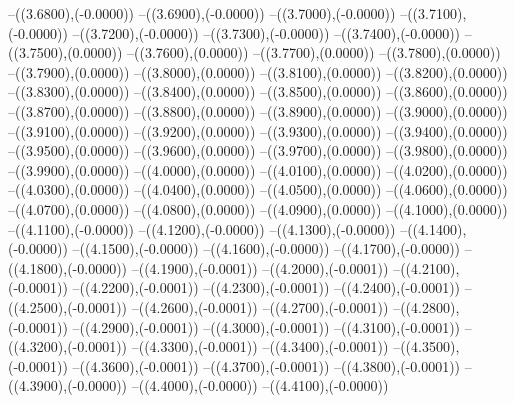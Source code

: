 {	--({\sx*(3.6800)},{\sy*(-0.0000)})
	--({\sx*(3.6900)},{\sy*(-0.0000)})
	--({\sx*(3.7000)},{\sy*(-0.0000)})
	--({\sx*(3.7100)},{\sy*(-0.0000)})
	--({\sx*(3.7200)},{\sy*(-0.0000)})
	--({\sx*(3.7300)},{\sy*(-0.0000)})
	--({\sx*(3.7400)},{\sy*(-0.0000)})
	--({\sx*(3.7500)},{\sy*(0.0000)})
	--({\sx*(3.7600)},{\sy*(0.0000)})
	--({\sx*(3.7700)},{\sy*(0.0000)})
	--({\sx*(3.7800)},{\sy*(0.0000)})
	--({\sx*(3.7900)},{\sy*(0.0000)})
	--({\sx*(3.8000)},{\sy*(0.0000)})
	--({\sx*(3.8100)},{\sy*(0.0000)})
	--({\sx*(3.8200)},{\sy*(0.0000)})
	--({\sx*(3.8300)},{\sy*(0.0000)})
	--({\sx*(3.8400)},{\sy*(0.0000)})
	--({\sx*(3.8500)},{\sy*(0.0000)})
	--({\sx*(3.8600)},{\sy*(0.0000)})
	--({\sx*(3.8700)},{\sy*(0.0000)})
	--({\sx*(3.8800)},{\sy*(0.0000)})
	--({\sx*(3.8900)},{\sy*(0.0000)})
	--({\sx*(3.9000)},{\sy*(0.0000)})
	--({\sx*(3.9100)},{\sy*(0.0000)})
	--({\sx*(3.9200)},{\sy*(0.0000)})
	--({\sx*(3.9300)},{\sy*(0.0000)})
	--({\sx*(3.9400)},{\sy*(0.0000)})
	--({\sx*(3.9500)},{\sy*(0.0000)})
	--({\sx*(3.9600)},{\sy*(0.0000)})
	--({\sx*(3.9700)},{\sy*(0.0000)})
	--({\sx*(3.9800)},{\sy*(0.0000)})
	--({\sx*(3.9900)},{\sy*(0.0000)})
	--({\sx*(4.0000)},{\sy*(0.0000)})
	--({\sx*(4.0100)},{\sy*(0.0000)})
	--({\sx*(4.0200)},{\sy*(0.0000)})
	--({\sx*(4.0300)},{\sy*(0.0000)})
	--({\sx*(4.0400)},{\sy*(0.0000)})
	--({\sx*(4.0500)},{\sy*(0.0000)})
	--({\sx*(4.0600)},{\sy*(0.0000)})
	--({\sx*(4.0700)},{\sy*(0.0000)})
	--({\sx*(4.0800)},{\sy*(0.0000)})
	--({\sx*(4.0900)},{\sy*(0.0000)})
	--({\sx*(4.1000)},{\sy*(0.0000)})
	--({\sx*(4.1100)},{\sy*(-0.0000)})
	--({\sx*(4.1200)},{\sy*(-0.0000)})
	--({\sx*(4.1300)},{\sy*(-0.0000)})
	--({\sx*(4.1400)},{\sy*(-0.0000)})
	--({\sx*(4.1500)},{\sy*(-0.0000)})
	--({\sx*(4.1600)},{\sy*(-0.0000)})
	--({\sx*(4.1700)},{\sy*(-0.0000)})
	--({\sx*(4.1800)},{\sy*(-0.0000)})
	--({\sx*(4.1900)},{\sy*(-0.0001)})
	--({\sx*(4.2000)},{\sy*(-0.0001)})
	--({\sx*(4.2100)},{\sy*(-0.0001)})
	--({\sx*(4.2200)},{\sy*(-0.0001)})
	--({\sx*(4.2300)},{\sy*(-0.0001)})
	--({\sx*(4.2400)},{\sy*(-0.0001)})
	--({\sx*(4.2500)},{\sy*(-0.0001)})
	--({\sx*(4.2600)},{\sy*(-0.0001)})
	--({\sx*(4.2700)},{\sy*(-0.0001)})
	--({\sx*(4.2800)},{\sy*(-0.0001)})
	--({\sx*(4.2900)},{\sy*(-0.0001)})
	--({\sx*(4.3000)},{\sy*(-0.0001)})
	--({\sx*(4.3100)},{\sy*(-0.0001)})
	--({\sx*(4.3200)},{\sy*(-0.0001)})
	--({\sx*(4.3300)},{\sy*(-0.0001)})
	--({\sx*(4.3400)},{\sy*(-0.0001)})
	--({\sx*(4.3500)},{\sy*(-0.0001)})
	--({\sx*(4.3600)},{\sy*(-0.0001)})
	--({\sx*(4.3700)},{\sy*(-0.0001)})
	--({\sx*(4.3800)},{\sy*(-0.0001)})
	--({\sx*(4.3900)},{\sy*(-0.0000)})
	--({\sx*(4.4000)},{\sy*(-0.0000)})
	--({\sx*(4.4100)},{\sy*(-0.0000)})
}

